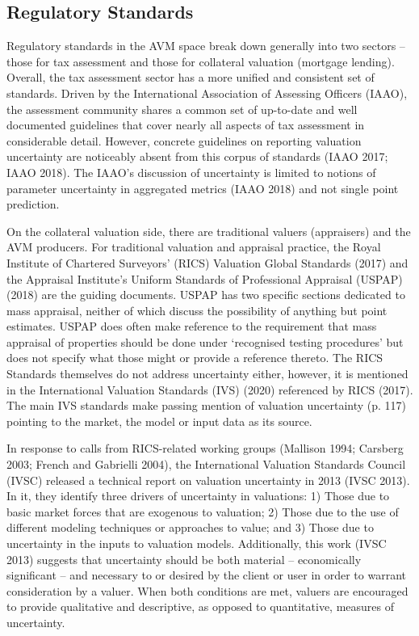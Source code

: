 \documentclass[colTwo]{anon}
\theoremstyle{definition}
\begin{document}
\subsection{Regulatory Standards}

Regulatory standards in the AVM space break down generally into two sectors -- those for tax assessment and those for collateral valuation (mortgage lending).  Overall, the tax assessment sector has a more unified and consistent set of standards.  Driven by the International Association of Assessing Officers (IAAO), the assessment community shares a common set of up-to-date and well documented guidelines that cover nearly all aspects of tax assessment in considerable detail.  However, concrete guidelines on reporting valuation uncertainty are noticeably absent from this corpus of standards (IAAO 2017; IAAO 2018). The IAAO's discussion of uncertainty is limited to notions of parameter uncertainty in aggregated metrics (IAAO 2018) and not single point prediction.  

On the collateral valuation side, there are traditional valuers (appraisers) and the AVM producers. For traditional valuation and appraisal practice, the Royal Institute of Chartered Surveyors’ (RICS) Valuation Global Standards (2017) and the Appraisal Institute’s Uniform Standards of Professional Appraisal (USPAP) (2018) are the guiding documents. USPAP has two specific sections dedicated to mass appraisal, neither of which discuss the possibility of anything but point estimates. USPAP does often make reference to the requirement that mass appraisal of properties should be done under ‘recognised testing procedures’ but does not specify what those might or provide a reference thereto. The RICS Standards themselves do not address uncertainty either, however, it is mentioned in the International Valuation Standards (IVS) (2020) referenced by RICS (2017).  The main IVS standards make passing mention of valuation uncertainty (p. 117) pointing to the market, the model or input data as its source.  

In response to calls from RICS-related working groups (Mallison 1994; Carsberg 2003; French and Gabrielli 2004), the International Valuation Standards Council (IVSC) released a technical report on valuation uncertainty in 2013 (IVSC 2013).  In it, they identify three drivers of uncertainty in valuations: 1) Those due to basic market forces that are exogenous to valuation; 2) Those due to the use of different modeling techniques or approaches to value; and 3) Those due to uncertainty in the inputs to valuation models. Additionally, this work (IVSC 2013) suggests that uncertainty should be both material -- economically significant -- and necessary to or desired by the client or user in order to warrant consideration by a valuer. When both conditions are met, valuers are encouraged to provide qualitative and descriptive, as opposed to quantitative, measures of uncertainty.     
\end{document}
